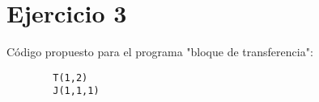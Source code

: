 \section{Ejercicio 3}
  		Código propuesto para el programa "bloque de transferencia":
  		\begin{verbatim}
  		T(1,2)
  		J(1,1,1)
  		\end{verbatim}
